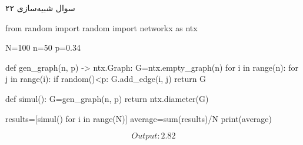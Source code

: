 سوال شبیه‌سازی ۲۲

\begin{latin}
\begin{python}
from random import random
import networkx as ntx

N=100
n=50
p=0.34

def gen_graph(n, p) -> ntx.Graph:
	G=ntx.empty_graph(n)
	for i in range(n):
		for j in range(i):
			if random()<p:
				G.add_edge(i, j)
	return G

def simul():
	G=gen_graph(n, p)
	return ntx.diameter(G)

results=[simul() for i in range(N)]
average=sum(results)/N
print(average)
\end{python}
\end{latin}

$$
Output: 2.82
$$